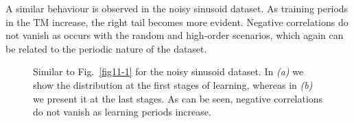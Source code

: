 \documentclass[11pt,letterpaper]{article}
\begin{document}
            A similar behaviour is observed in the noisy sinusoid dataset.
            As training periods in the TM increase, the right tail becomes more evident.
            Negative correlations do not vanish as occurs with the random and 
            high-order scenarios, which again can be related to the periodic nature
            of the dataset.

		    \begin{figure}[t]
			    \centering
			    \caption{
			        Similar to Fig.~\ref{fig11-1} for the noisy sinusoid dataset.
                    In \emph{(a)} we show the distribution at the
			        first stages of learning, whereas in \emph{(b)} we present it at
			        the last stages. As can be seen, negative correlations do not
			        vanish as learning periods increase.
			    }
			    \label{fig11-2}
		    \end{figure}
\end{document}
